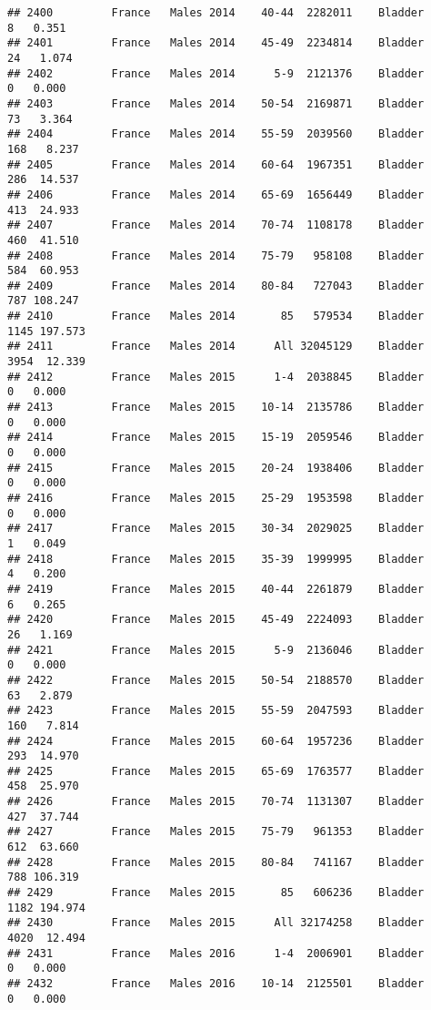 \documentclass[
]{article}
\begin{document}
\begin{verbatim}
## 2400         France   Males 2014    40-44  2282011    Bladder      8   0.351
## 2401         France   Males 2014    45-49  2234814    Bladder     24   1.074
## 2402         France   Males 2014      5-9  2121376    Bladder      0   0.000
## 2403         France   Males 2014    50-54  2169871    Bladder     73   3.364
## 2404         France   Males 2014    55-59  2039560    Bladder    168   8.237
## 2405         France   Males 2014    60-64  1967351    Bladder    286  14.537
## 2406         France   Males 2014    65-69  1656449    Bladder    413  24.933
## 2407         France   Males 2014    70-74  1108178    Bladder    460  41.510
## 2408         France   Males 2014    75-79   958108    Bladder    584  60.953
## 2409         France   Males 2014    80-84   727043    Bladder    787 108.247
## 2410         France   Males 2014       85   579534    Bladder   1145 197.573
## 2411         France   Males 2014      All 32045129    Bladder   3954  12.339
## 2412         France   Males 2015      1-4  2038845    Bladder      0   0.000
## 2413         France   Males 2015    10-14  2135786    Bladder      0   0.000
## 2414         France   Males 2015    15-19  2059546    Bladder      0   0.000
## 2415         France   Males 2015    20-24  1938406    Bladder      0   0.000
## 2416         France   Males 2015    25-29  1953598    Bladder      0   0.000
## 2417         France   Males 2015    30-34  2029025    Bladder      1   0.049
## 2418         France   Males 2015    35-39  1999995    Bladder      4   0.200
## 2419         France   Males 2015    40-44  2261879    Bladder      6   0.265
## 2420         France   Males 2015    45-49  2224093    Bladder     26   1.169
## 2421         France   Males 2015      5-9  2136046    Bladder      0   0.000
## 2422         France   Males 2015    50-54  2188570    Bladder     63   2.879
## 2423         France   Males 2015    55-59  2047593    Bladder    160   7.814
## 2424         France   Males 2015    60-64  1957236    Bladder    293  14.970
## 2425         France   Males 2015    65-69  1763577    Bladder    458  25.970
## 2426         France   Males 2015    70-74  1131307    Bladder    427  37.744
## 2427         France   Males 2015    75-79   961353    Bladder    612  63.660
## 2428         France   Males 2015    80-84   741167    Bladder    788 106.319
## 2429         France   Males 2015       85   606236    Bladder   1182 194.974
## 2430         France   Males 2015      All 32174258    Bladder   4020  12.494
## 2431         France   Males 2016      1-4  2006901    Bladder      0   0.000
## 2432         France   Males 2016    10-14  2125501    Bladder      0   0.000

\end{verbatim}
\end{document}
